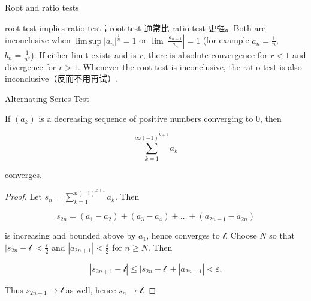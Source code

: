 \begin{qlremark}{Root and ratio tests}

root test implies ratio test；root test 通常比 ratio test 更强。Both are inconclusive when \(\operatorname{lim\, sup}\left| a_{n} \right|^{\frac{1}{n}} = 1\) or \(\lim\left| \frac{a_{n + 1}}{a_{n}} \right| = 1\) (for example \(a_{n} = \frac{1}{n}\), \(b_{n} = \frac{1}{n^{2}}\)). If either limit exists and is \(r\), there is absolute convergence for \(r < 1\) and divergence for \(r > 1\). Whenever the root test is inconclusive, the ratio test is also inconclusive（反而不用再试）.

\end{qlremark}

\begin{theorem}{Alternating Series Test}

If \(\left( a_{k} \right)\) is a decreasing sequence of positive numbers converging to \(0\), then

\[\sum\limits_{k = 1}^{{\infty{({- 1})}}^{k + 1}}a_{k}\]

converges.

\end{theorem}

\begin{proof}

Let \(s_{n} = \sum_{k = 1}^{{n{({- 1})}}^{k + 1}}a_{k}\). Then

\[s_{2n} = \left( {a_{1} - a_{2}} \right) + \left( {a_{3} - a_{4}} \right) + \ldots + \left( {a_{2n - 1} - a_{2n}} \right)\]

is increasing and bounded above by \(a_{1}\), hence converges to \(\mathcal{l}\). Choose \(N\) so that \(\left| {s_{2n} - \mathcal{l}} \right| < \frac{\varepsilon}{2}\) and \(\left| a_{2n + 1} \right| < \frac{\varepsilon}{2}\) for \(n \geq N\). Then

\[\left| {s_{2n + 1} - \mathcal{l}} \right| \leq \left| {s_{2n} - \mathcal{l}} \right| + \left| a_{2n + 1} \right| < \varepsilon.\]

Thus \(s_{2n + 1}\rightarrow\mathcal{l}\) as well, hence \(s_{n}\rightarrow\mathcal{l}\).

\end{proof}

